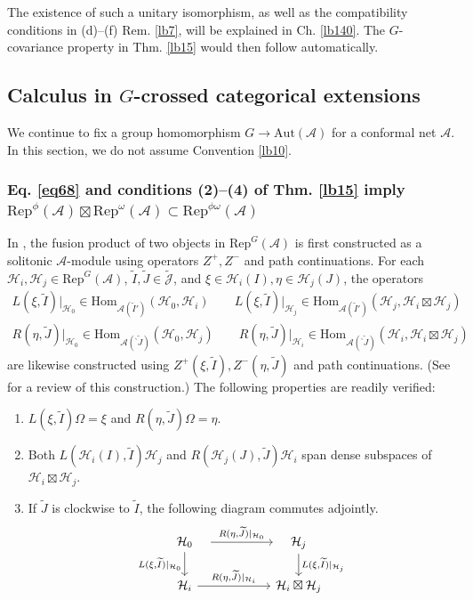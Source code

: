 \documentclass[11pt,b5paper,notitlepage]{article}
\theoremstyle{definition}
\theoremstyle{plain}
\newcommand{\wtd}{\widetilde}
\newcommand{\Hom}{\mathrm{Hom}}
\newcommand{\Rep}{\mathrm{Rep}}
\newcommand{\RepGA}{\mathrm{Rep}^G(\mathcal A)}
\newcommand{\Jtd}{\widetilde{\mathcal J}}
\newcommand{\bpr}{{}^\backprime}
\newcommand{\Aut}{\mathrm{Aut}}
\newcommand{\MA}{\mathcal A}
\newcommand{\MH}{\mathcal H}
\numberwithin{equation}{section}
\begin{document}
The existence of such a unitary isomorphism, as well as the compatibility conditions in (d)--(f) Rem. \ref{lb7}, will be explained in Ch. \ref{lb140}. The $G$-covariance property in Thm. \ref{lb15} would then follow automatically.




\subsection{Calculus in $G$-crossed categorical extensions}


We continue to fix a group homomorphism $G\rightarrow\Aut(\MA)$ for a conformal net $\MA$. In this section, we do not assume Convention \ref{lb10}.



\subsubsection{Eq. \eqref{eq68} and conditions (2)--(4) of Thm. \ref{lb15} imply $\Rep^\phi(\MA)\boxtimes\Rep^\omega(\MA)\subset\Rep^{\phi\omega}(\MA)$}


In \cite{MS26a}, the fusion product of two objects in $\RepGA$ is first constructed as a solitonic $\MA$-module using operators $Z^+,Z^-$ and path continuations. For each $\MH_i,\MH_j\in\RepGA$, $\wtd I,\wtd J\in\Jtd$, and $\xi\in\MH_i(I),\eta\in\MH_j(J)$, the operators
\begin{gather*}
L(\xi,\wtd I)\big|_{\MH_0}\in\Hom_{\MA(\wtd I')}(\MH_0,\MH_i)\qquad L(\xi,\wtd I)|_{\MH_j}\in\Hom_{\MA(\wtd I')}(\MH_j,\MH_i\boxtimes\MH_j)\\
R(\eta,\wtd J)\big|_{\MH_0}\in\Hom_{\MA(\bpr\wtd J)}(\MH_0,\MH_j)\qquad R(\eta,\wtd J)|_{\MH_i}\in\Hom_{\MA(\bpr\wtd J)}(\MH_i,\MH_i\boxtimes\MH_j)
\end{gather*}
are likewise constructed using $Z^+(\xi,\wtd I),Z^-(\eta,\wtd J)$ and path continuations. (See \cite{MS26b} for a review of this construction.) The following properties are readily verified:
\begin{enumerate}
\item[(2)] $L(\xi,\wtd I)\Omega=\xi$ and $R(\eta,\wtd J)\Omega=\eta$. 
\item[(3)] Both $L(\MH_i(I),\wtd I)\MH_j$ and $R(\MH_j(J),\wtd J)\MH_i$ span dense subspaces of $\MH_i\boxtimes\MH_j$.
\item[(4)] If $\wtd J$ is clockwise to $\wtd I$, the following diagram commutes adjointly.
\begin{equation*}
\begin{tikzcd}
\quad \MH_0\quad \arrow[rr,"{R(\eta,\wtd J)|_{\MH_0}}"] \arrow[d, "{L(\xi,\wtd I)|_{\MH_0}}"'] &&\quad \MH_j\quad \arrow[d, "{L(\xi,\wtd I)|_{\MH_j}}"]\\
\MH_i\arrow[rr,"{R(\eta,\wtd J)|_{\MH_i}}"] &&\MH_i\boxtimes\MH_j
\end{tikzcd}
\end{equation*}
\end{enumerate}
\end{document}
